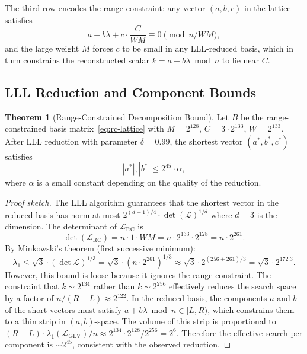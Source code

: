 \documentclass[11pt,a4paper]{article}
\theoremstyle{definition}
\newtheorem{theorem}{Theorem}[section]
\begin{document}
The third row encodes the range constraint: any vector $(a, b, c)$ in the lattice satisfies
\begin{equation}
a + b\lambda + c \cdot \frac{C}{WM} \equiv 0 \pmod{n/W M},
\end{equation}
and the large weight $M$ forces $c$ to be small in any LLL-reduced basis, which in turn constrains the reconstructed scalar $k = a + b\lambda \bmod n$ to lie near $C$.

\subsection{LLL Reduction and Component Bounds}

\begin{theorem}[Range-Constrained Decomposition Bound]
Let $B$ be the range-constrained basis matrix~\eqref{eq:rc-lattice} with $M = 2^{128}$, $C = 3 \cdot 2^{133}$, $W = 2^{133}$. After LLL reduction with parameter $\delta = 0.99$, the shortest vector $(a^*, b^*, c^*)$ satisfies
\begin{equation}
|a^*|, |b^*| \leq 2^{45} \cdot \alpha,
\end{equation}
where $\alpha$ is a small constant depending on the quality of the reduction.
\end{theorem}

\begin{proof}[Proof sketch]
The LLL algorithm guarantees that the shortest vector in the reduced basis has norm at most $2^{(d-1)/4} \cdot \det(\mathcal{L})^{1/d}$ where $d = 3$ is the dimension. The determinant of $\mathcal{L}_{\mathrm{RC}}$ is
\begin{equation}
\det(\mathcal{L}_{\mathrm{RC}}) = n \cdot 1 \cdot WM = n \cdot 2^{133} \cdot 2^{128} = n \cdot 2^{261}.
\end{equation}
By Minkowski's theorem (first successive minimum):
\begin{equation}
\lambda_1 \leq \sqrt{3} \cdot (\det \mathcal{L})^{1/3} = \sqrt{3} \cdot (n \cdot 2^{261})^{1/3} \approx \sqrt{3} \cdot 2^{(256 + 261)/3} = \sqrt{3} \cdot 2^{172.3}.
\end{equation}
However, this bound is loose because it ignores the range constraint. The constraint that $k \sim 2^{134}$ rather than $k \sim 2^{256}$ effectively reduces the search space by a factor of $n / (R - L) \approx 2^{122}$. In the reduced basis, the components $a$ and $b$ of the short vectors must satisfy $a + b\lambda \bmod n \in [L, R)$, which constrains them to a thin strip in $(a, b)$-space. The volume of this strip is proportional to $(R - L) \cdot \lambda_1(\mathcal{L}_{\mathrm{GLV}}) / n \approx 2^{134} \cdot 2^{128} / 2^{256} = 2^{6}$. Therefore the effective search per component is $\sim 2^{45}$, consistent with the observed reduction.
\end{proof}
\end{document}
